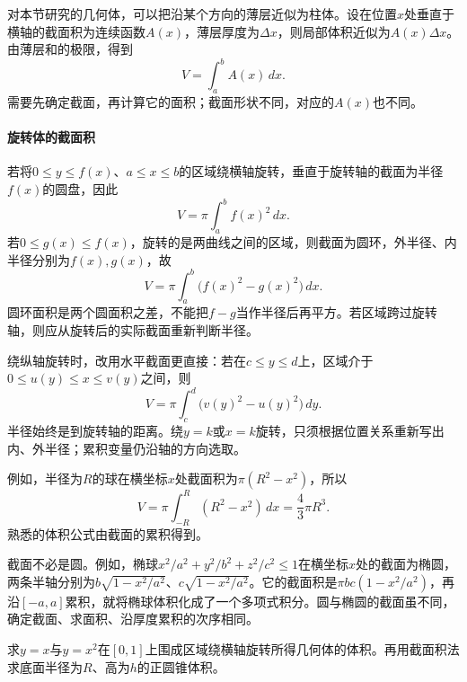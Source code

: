 对本节研究的几何体，可以把沿某个方向的薄层近似为柱体。设在位置\(x\)处垂直于横轴的截面积为连续函数\(A(x)\)，薄层厚度为\(\Delta x\)，则局部体积近似为\(A(x)\Delta x\)。由薄层和的极限，得到
\begin{equation}\label{eq:calculus-volume}
 V=\int_a^b A(x)\,dx.
\end{equation}
需要先确定截面，再计算它的面积；截面形状不同，对应的\(A(x)\)也不同。

\paragraph{旋转体的截面积} \mbox{}

若将\(0\le y\le f(x)\)、\(a\le x\le b\)的区域绕横轴旋转，垂直于旋转轴的截面为半径\(f(x)\)的圆盘，因此
\begin{equation*}
 V=\pi\int_a^bf(x)^2\,dx.
\end{equation*}
若\(0\le g(x)\le f(x)\)，旋转的是两曲线之间的区域，则截面为圆环，外半径、内半径分别为\(f(x),g(x)\)，故
\begin{equation}\label{eq:calculus-washer-volume}
 V=\pi\int_a^b\bigl(f(x)^2-g(x)^2\bigr)\,dx.
\end{equation}
圆环面积是两个圆面积之差，不能把\(f-g\)当作半径后再平方。若区域跨过旋转轴，则应从旋转后的实际截面重新判断半径。

绕纵轴旋转时，改用水平截面更直接：若在\(c\le y\le d\)上，区域介于\(0\le u(y)\le x\le v(y)\)之间，则
\begin{equation*}
 V=\pi\int_c^d\bigl(v(y)^2-u(y)^2\bigr)\,dy.
\end{equation*}
半径始终是到旋转轴的距离。绕\(y=k\)或\(x=k\)旋转，只须根据位置关系重新写出内、外半径；累积变量仍沿轴的方向选取。

例如，半径为\(R\)的球在横坐标\(x\)处截面积为\(\pi(R^2-x^2)\)，所以
\begin{equation*}
 V=\pi\int_{-R}^R(R^2-x^2)\,dx=\frac43\pi R^3.
\end{equation*}
熟悉的体积公式由截面的累积得到。

截面不必是圆。例如，椭球\(x^2/a^2+y^2/b^2+z^2/c^2\le1\)在横坐标\(x\)处的截面为椭圆，两条半轴分别为\(b\sqrt{1-x^2/a^2}\)、\(c\sqrt{1-x^2/a^2}\)。它的截面积是\(\pi bc(1-x^2/a^2)\)，再沿\([-a,a]\)累积，就将椭球体积化成了一个多项式积分。圆与椭圆的截面虽不同，确定截面、求面积、沿厚度累积的次序相同。

\begin{example}
求\(y=x\)与\(y=x^2\)在\([0,1]\)上围成区域绕横轴旋转所得几何体的体积。再用截面积法求底面半径为\(R\)、高为\(h\)的正圆锥体积。
\end{example}

